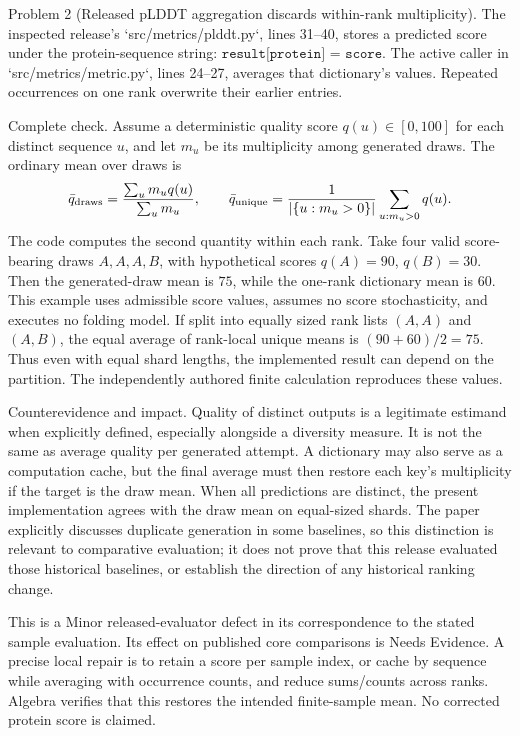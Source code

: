 \documentclass[10pt]{article}
\begin{document}
Problem 2 (Released pLDDT aggregation discards within-rank multiplicity).  The inspected release’s `src/metrics/plddt.py`, lines 31–40, stores a predicted score under the protein-sequence string: \(\texttt{result[protein] = score}\). The active caller in `src/metrics/metric.py`, lines 24–27, averages that dictionary’s values. Repeated occurrences on one rank overwrite their earlier entries.\par
Complete check. Assume a deterministic quality score \(q(u)\in[0,100]\) for each distinct sequence \(u\), and let \(m_u\) be its multiplicity among generated draws. The ordinary mean over draws is \[\bar q_{\rm draws}=\frac{\sum_u m_uq(u)}{\sum_u m_u},
 \qquad
 \bar q_{\rm unique}=\frac{1}{|\{u:m_u>0\}|}\sum_{u:m_u>0}q(u).\] The code computes the second quantity within each rank. Take four valid score-bearing draws \(A,A,A,B\), with hypothetical scores \(q(A)=90\), \(q(B)=30\). Then the generated-draw mean is \(75\), while the one-rank dictionary mean is \(60\). This example uses admissible score values, assumes no score stochasticity, and executes no folding model. If split into equally sized rank lists \((A,A)\) and \((A,B)\), the equal average of rank-local unique means is \((90+60)/2=75\). Thus even with equal shard lengths, the implemented result can depend on the partition. The independently authored finite calculation reproduces these values.\par
Counterevidence and impact. Quality of distinct outputs is a legitimate estimand when explicitly defined, especially alongside a diversity measure. It is not the same as average quality per generated attempt. A dictionary may also serve as a computation cache, but the final average must then restore each key’s multiplicity if the target is the draw mean. When all predictions are distinct, the present implementation agrees with the draw mean on equal-sized shards. The paper explicitly discusses duplicate generation in some baselines, so this distinction is relevant to comparative evaluation; it does not prove that this release evaluated those historical baselines, or establish the direction of any historical ranking change.\par
This is a Minor released-evaluator defect in its correspondence to the stated sample evaluation. Its effect on published core comparisons is Needs Evidence. A precise local repair is to retain a score per sample index, or cache by sequence while averaging with occurrence counts, and reduce sums/counts across ranks. Algebra verifies that this restores the intended finite-sample mean. No corrected protein score is claimed.\par
\end{document}
